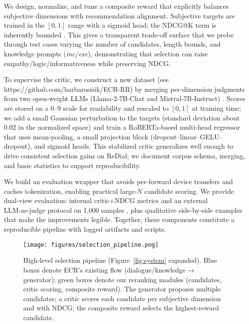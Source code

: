 \documentclass[12pt]{article}
\begin{document}
  We design, normalize, and tune a composite reward that explicitly balances subjective dimensions with recommendation alignment. Subjective targets are trained in the \([0,1]\) range with a sigmoid head; the NDCG@K term is inherently bounded \citep{evidently_ndcg}. This gives a transparent trade‑off surface that we probe through test cases varying the number of candidates, length bounds, and knowledge prompts (\textit{inc}/\textit{exc}), demonstrating that selection can raise empathy/logic/informativeness while preserving NDCG.
  
  To supervise the critic, we construct a new  dataset (see https://github.com/barbarosisik/ECR-RR) by merging per‑dimension judgments from two open‑weight LLMs (Llama‑2‑7B‑Chat and Mistral‑7B‑Instruct) \citep{meta2023llama2,mistral2023}. Scores are stored on a 0–9 scale for readability and rescaled to \([0,1]\) at training time; we add a small Gaussian perturbation to the targets (standard deviation about 0.02 in the normalized space) and train a RoBERTa‑based multi‑head regressor \citep{liu2019roberta} that uses mean‑pooling, a small projection block (dropout–linear–GELU–dropout), and sigmoid heads. This stabilized critic generalizes well enough to drive consistent selection gains on ReDial; we document corpus schema, merging, and basic statistics to support reproducibility.
  
  We build an evaluation wrapper that avoids per‑forward device transfers and caches tokenization, enabling practical large‑$N$ candidate scoring. We provide dual‑view evaluation: internal critic+NDCG metrics and an external LLM‑as‑judge protocol on 1{,}000 samples \citep{yan2023llmjudge}, plus qualitative side‑by‑side examples that make the improvements legible. Together, these components constitute a reproducible pipeline with logged artifacts and scripts.
  
  \begin{figure}[h]
  \centering
  \texttt{[image: figures/selection\_pipeline.png]}
  \caption{High‑level selection pipeline (Figure~\ref{fig:system} expanded). Blue boxes denote ECR's existing flow (dialogue/knowledge → generator); green boxes denote our reranking modules (candidates, critic scoring, composite reward). The generator proposes multiple candidates; a critic scores each candidate per subjective dimension and with NDCG; the composite reward selects the highest‑reward candidate.}
  \label{fig:contrib_pipeline}
  \end{figure}
  
\end{document}
